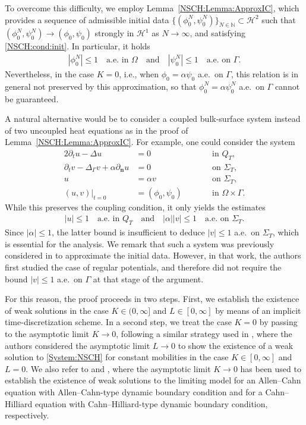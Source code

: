 \documentclass[11pt,reqno]{amsart}
\theoremstyle{remark}
\numberwithin{equation}{section}
\newcommand{\abs}[1]{|#1|}
\newcommand{\N}{\mathbb N}
\newcommand{\n}{\mathbf{n}}
\newcommand{\delt}{\partial_{t}}
\newcommand{\deln}{\partial_\n}
\newcommand{\Lap}{\Delta}
\newcommand{\Lapg}{\Delta_\Ga}
\newcommand{\Om}{\Omega}
\newcommand{\Ga}{\Gamma}
\begin{document}
To overcome this difficulty, we employ Lemma~\ref{NSCH:Lemma:ApproxIC}, which provides a sequence of admissible initial data $\{(\phi_0^N,\psi_0^N)\}_{N\in\N}\subset\mathcal{H}^2$ such that $(\phi_0^N,\psi_0^N)\rightarrow(\phi_0,\psi_0)$ strongly in $\mathcal{H}^1$ as $N\rightarrow\infty$, and satisfying \eqref{NSCH:cond:init}. In particular, it holds
\begin{align}\label{nsch:remark}
	\abs{\phi_0^N} \leq 1 \quad\text{a.e.~in~}\Om \quad\text{and} \quad\abs{\psi_0^N} \leq 1 \quad\text{a.e.~on~}\Ga.
\end{align}
Nevertheless, in the case $K = 0$, i.e., when $\phi_0 = \alpha\psi_0$ a.e.~on $\Ga$, this relation is in general not preserved by this approximation, so that $\phi_0^N = \alpha\psi_0^N$ a.e.~on $\Ga$ cannot be guaranteed. 

A natural alternative would be to consider a coupled bulk-surface system instead of two uncoupled heat equations as in the proof of Lemma~\ref{NSCH:Lemma:ApproxIC}. For example, one could consider the system
\begin{alignat*}{2}
	\delt u - \Lap u &= 0 &&\qquad\text{in~}Q_T, \\
	\delt v - \Lapg v + \alpha\deln u &= 0 &&\qquad\text{on~}\Sigma_T, \\
	u &= \alpha v &&\qquad\text{on~}\Sigma_T, \\
	(u,v)\vert_{t=0} &= (\phi_0,\psi_0) &&\qquad\text{in~}\Om\times\Gamma.
\end{alignat*}
While this preserves the coupling condition, it only yields the estimates
\begin{align*}
	\abs{u} \leq 1 \quad\text{a.e.~in~}Q_T \quad\text{and}\quad \abs{\alpha}\abs{v} \leq 1 \quad\text{a.e.~on~}\Sigma_T.
\end{align*}
Since $\abs{\alpha} \leq 1$, the latter bound is insufficient to deduce $\abs{v} \leq 1$ a.e.~on $\Sigma_T$, which is essential for the analysis. We remark that such a system was previously considered in \cite{Gal2019} to approximate the initial data. However, in that work, the authors first studied the case of regular potentials, and therefore did not require the bound $\abs{v} \leq 1$ a.e.~on $\Ga$ at that stage of the argument.

For this reason, the proof proceeds in two steps. First, we establish the existence of weak solutions in the case $K\in(0,\infty]$ and $L\in[0,\infty]$ by means of an implicit time-discretization scheme. In a second step, we treat the case $K = 0$ by passing to the asymptotic limit $K\rightarrow 0$, following a similar strategy used in \cite{Knopf2025a}, where the authors considered the asymptotic limit $L\rightarrow 0$ to show the existence of a weak solution to \eqref{System:NSCH} for constant mobilities in the case $K\in[0,\infty]$ and $L = 0$. We also refer to \cite{Colli2019a} and \cite{Knopf2020}, where the asymptotic limit $K\rightarrow 0$ has been used to establish the existence of weak solutions to the limiting model for an Allen--Cahn equation with Allen--Cahn-type dynamic boundary condition and for a Cahn--Hilliard equation with Cahn--Hilliard-type dynamic boundary condition, respectively.
\end{document}

